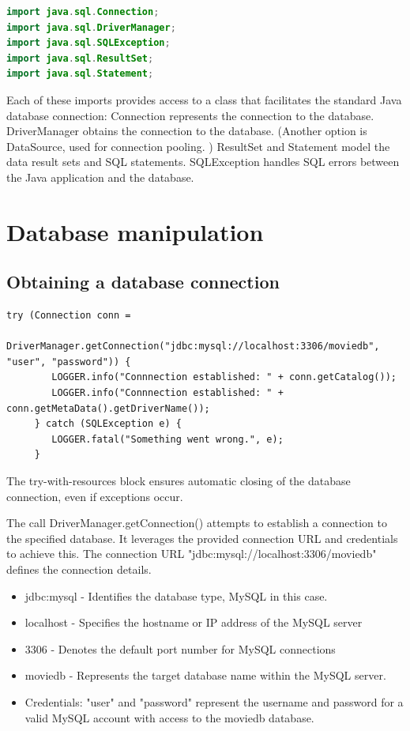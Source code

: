 \begin{lstlisting}[language=java,frame=single]
import java.sql.Connection;
import java.sql.DriverManager;
import java.sql.SQLException;
import java.sql.ResultSet;
import java.sql.Statement;
\end{lstlisting}

Each of these imports provides access to a class that facilitates the standard Java database connection:
Connection represents the connection to the database.
DriverManager obtains the connection to the database. (Another option is DataSource, used for connection pooling. )
ResultSet and Statement model the data result sets and SQL statements.
SQLException handles SQL errors between the Java application and the database.


\section{Database manipulation}
\subsection{Obtaining a database connection}

\begin{lstlisting}
try (Connection conn = 
          DriverManager.getConnection("jdbc:mysql://localhost:3306/moviedb", "user", "password")) {
        LOGGER.info("Connnection established: " + conn.getCatalog());
        LOGGER.info("Connnection established: " + conn.getMetaData().getDriverName());
     } catch (SQLException e) {
        LOGGER.fatal("Something went wrong.", e);
     }

\end{lstlisting}

The try-with-resources block ensures automatic closing of the database connection, even if exceptions occur.

The call DriverManager.getConnection() attempts to establish a connection to the specified database.  It leverages the provided connection URL and credentials to achieve this.
The connection URL "jdbc:mysql://localhost:3306/moviedb" defines the connection details.
\begin{itemize}
\item jdbc:mysql - Identifies the database type, MySQL in this case.
\item localhost - Specifies the hostname or IP address of the MySQL server
\item 3306 - Denotes the default port number for MySQL connections
\item moviedb - Represents the target database name within the MySQL server.
\item Credentials: "user" and "password" represent the username and password for a valid MySQL account with access to the moviedb database. 
\end{itemize}

